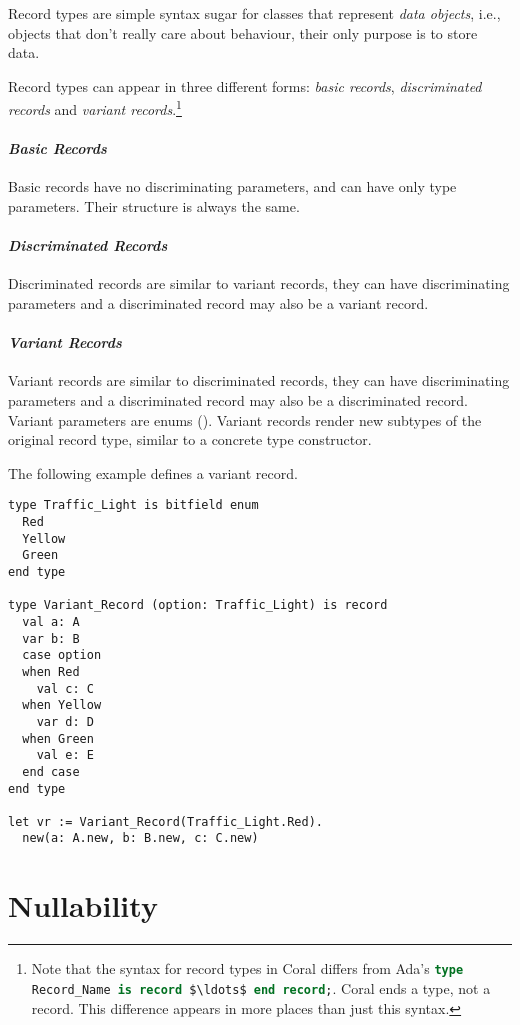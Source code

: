 Record types are simple syntax sugar for classes that represent {\em data objects}, i.e., objects that don't really care about behaviour, their only purpose is to store data. 

Record types can appear in three different forms: {\em basic records}, {\em discriminated records} and {\em variant records}.\footnote{Note that the syntax for record types in Coral differs from Ada's \lstinline[language=Ada]!type Record_Name is record $\ldots$ end record;!. Coral ends a type, not a record. This difference appears in more places than just this syntax.}

\paragraph{\em Basic Records}
Basic records have no discriminating parameters, and can have only type parameters. Their structure is always the same. 

\paragraph{\em Discriminated Records}
Discriminated records are similar to variant records, they can have discriminating parameters and a discriminated record may also be a variant record. 

\paragraph{\em Variant Records}
Variant records are similar to discriminated records, they can have discriminating parameters and a discriminated record may also be a discriminated record. Variant parameters are enums (). Variant records render new subtypes of the original record type, similar to a concrete type constructor.

\example The following example defines a variant record. 
\begin{lstlisting}
type Traffic_Light is bitfield enum
  Red
  Yellow
  Green
end type

type Variant_Record (option: Traffic_Light) is record
  val a: A
  var b: B
  case option
  when Red
    val c: C
  when Yellow
    var d: D
  when Green
    val e: E
  end case
end type

let vr := Variant_Record(Traffic_Light.Red).
  new(a: A.new, b: B.new, c: C.new)
\end{lstlisting}

\section{Nullability}
\label{sec:nullability}

